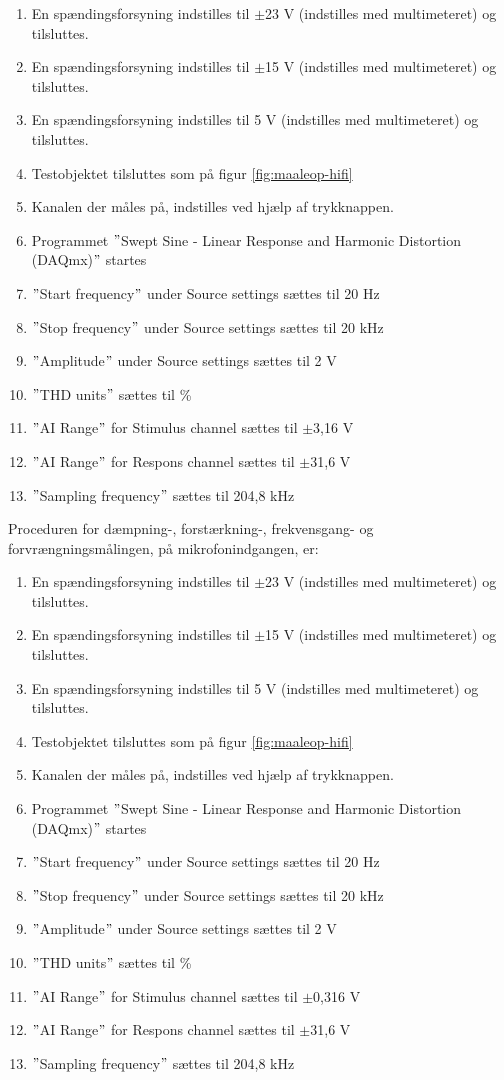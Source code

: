 \begin{enumerate}
\item En spændingsforsyning indstilles til $\pm$23 V (indstilles med multimeteret) og tilsluttes.
\item En spændingsforsyning indstilles til $\pm$15 V (indstilles med multimeteret) og tilsluttes.
\item En spændingsforsyning indstilles til 5 V (indstilles med multimeteret) og tilsluttes.
\item Testobjektet tilsluttes som på figur \ref{fig:maaleop-hifi}
\item Kanalen der måles på, indstilles ved hjælp af trykknappen.
\item Programmet $"$Swept Sine - Linear Response and Harmonic Distortion (DAQmx)$"$ startes
\item $"$Start frequency$"$ under Source settings sættes til 20 Hz
\item $"$Stop frequency$"$ under Source settings sættes til 20 kHz
\item $"$Amplitude$"$ under Source settings sættes til 2 V
\item $"$THD units$"$ sættes til \%
\item $"$AI Range$"$ for Stimulus channel sættes til $\pm$3,16 V
\item $"$AI Range$"$ for Respons channel sættes til $\pm$31,6 V
\item $"$Sampling frequency$"$ sættes til 204,8 kHz
\end{enumerate}

Proceduren for dæmpning-, forstærkning-, frekvensgang- og forvrængningsmålingen, på mikrofonindgangen, er:

\begin{enumerate}
\item En spændingsforsyning indstilles til $\pm$23 V (indstilles med multimeteret) og tilsluttes.
\item En spændingsforsyning indstilles til $\pm$15 V (indstilles med multimeteret) og tilsluttes.
\item En spændingsforsyning indstilles til 5 V (indstilles med multimeteret) og tilsluttes.
\item Testobjektet tilsluttes som på figur \ref{fig:maaleop-hifi}
\item Kanalen der måles på, indstilles ved hjælp af trykknappen.
\item Programmet $"$Swept Sine - Linear Response and Harmonic Distortion (DAQmx)$"$ startes
\item $"$Start frequency$"$ under Source settings sættes til 20 Hz
\item $"$Stop frequency$"$ under Source settings sættes til 20 kHz
\item $"$Amplitude$"$ under Source settings sættes til 2 V
\item $"$THD units$"$ sættes til \%
\item $"$AI Range$"$ for Stimulus channel sættes til $\pm$0,316 V
\item $"$AI Range$"$ for Respons channel sættes til $\pm$31,6 V
\item $"$Sampling frequency$"$ sættes til 204,8 kHz
\end{enumerate}

